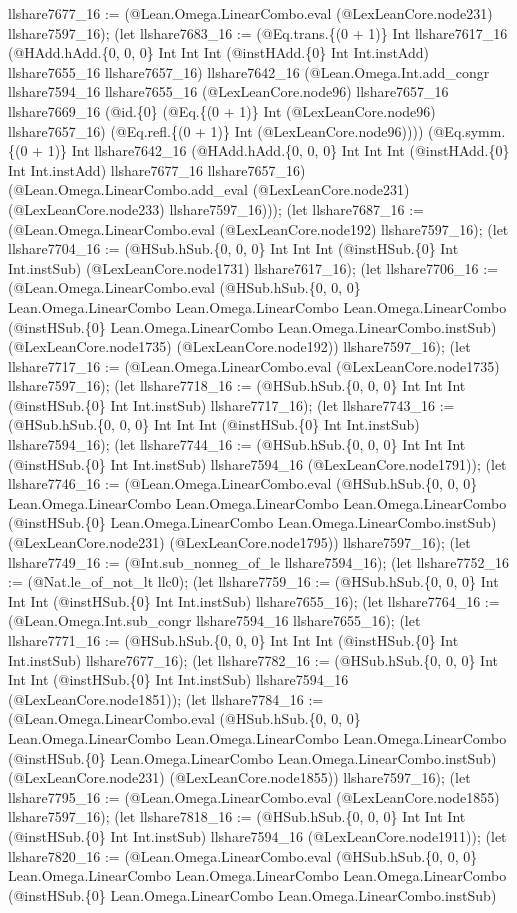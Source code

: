 \documentclass[11pt]{article}
\begin{document}
llshare7677\_16 := (@Lean.Omega.LinearCombo.eval (@LexLeanCore.node231) llshare7597\_16); (let llshare7683\_16 := (@Eq.trans.\{(0 + 1)\} Int llshare7617\_16 (@HAdd.hAdd.\{0, 0, 0\} Int Int Int (@instHAdd.\{0\} Int Int.instAdd) llshare7655\_16 llshare7657\_16) llshare7642\_16 (@Lean.Omega.Int.add\_congr llshare7594\_16 llshare7655\_16 (@LexLeanCore.node96) llshare7657\_16 llshare7669\_16 (@id.\{0\} (@Eq.\{(0 + 1)\} Int (@LexLeanCore.node96) llshare7657\_16) (@Eq.refl.\{(0 + 1)\} Int (@LexLeanCore.node96)))) (@Eq.symm.\{(0 + 1)\} Int llshare7642\_16 (@HAdd.hAdd.\{0, 0, 0\} Int Int Int (@instHAdd.\{0\} Int Int.instAdd) llshare7677\_16 llshare7657\_16) (@Lean.Omega.LinearCombo.add\_eval (@LexLeanCore.node231) (@LexLeanCore.node233) llshare7597\_16))); (let llshare7687\_16 := (@Lean.Omega.LinearCombo.eval (@LexLeanCore.node192) llshare7597\_16); (let llshare7704\_16 := (@HSub.hSub.\{0, 0, 0\} Int Int Int (@instHSub.\{0\} Int Int.instSub) (@LexLeanCore.node1731) llshare7617\_16); (let llshare7706\_16 := (@Lean.Omega.LinearCombo.eval (@HSub.hSub.\{0, 0, 0\} Lean.Omega.LinearCombo Lean.Omega.LinearCombo Lean.Omega.LinearCombo (@instHSub.\{0\} Lean.Omega.LinearCombo Lean.Omega.LinearCombo.instSub) (@LexLeanCore.node1735) (@LexLeanCore.node192)) llshare7597\_16); (let llshare7717\_16 := (@Lean.Omega.LinearCombo.eval (@LexLeanCore.node1735) llshare7597\_16); (let llshare7718\_16 := (@HSub.hSub.\{0, 0, 0\} Int Int Int (@instHSub.\{0\} Int Int.instSub) llshare7717\_16); (let llshare7743\_16 := (@HSub.hSub.\{0, 0, 0\} Int Int Int (@instHSub.\{0\} Int Int.instSub) llshare7594\_16); (let llshare7744\_16 := (@HSub.hSub.\{0, 0, 0\} Int Int Int (@instHSub.\{0\} Int Int.instSub) llshare7594\_16 (@LexLeanCore.node1791)); (let llshare7746\_16 := (@Lean.Omega.LinearCombo.eval (@HSub.hSub.\{0, 0, 0\} Lean.Omega.LinearCombo Lean.Omega.LinearCombo Lean.Omega.LinearCombo (@instHSub.\{0\} Lean.Omega.LinearCombo Lean.Omega.LinearCombo.instSub) (@LexLeanCore.node231) (@LexLeanCore.node1795)) llshare7597\_16); (let llshare7749\_16 := (@Int.sub\_nonneg\_of\_le llshare7594\_16); (let llshare7752\_16 := (@Nat.le\_of\_not\_lt llc0); (let llshare7759\_16 := (@HSub.hSub.\{0, 0, 0\} Int Int Int (@instHSub.\{0\} Int Int.instSub) llshare7655\_16); (let llshare7764\_16 := (@Lean.Omega.Int.sub\_congr llshare7594\_16 llshare7655\_16); (let llshare7771\_16 := (@HSub.hSub.\{0, 0, 0\} Int Int Int (@instHSub.\{0\} Int Int.instSub) llshare7677\_16); (let llshare7782\_16 := (@HSub.hSub.\{0, 0, 0\} Int Int Int (@instHSub.\{0\} Int Int.instSub) llshare7594\_16 (@LexLeanCore.node1851)); (let llshare7784\_16 := (@Lean.Omega.LinearCombo.eval (@HSub.hSub.\{0, 0, 0\} Lean.Omega.LinearCombo Lean.Omega.LinearCombo Lean.Omega.LinearCombo (@instHSub.\{0\} Lean.Omega.LinearCombo Lean.Omega.LinearCombo.instSub) (@LexLeanCore.node231) (@LexLeanCore.node1855)) llshare7597\_16); (let llshare7795\_16 := (@Lean.Omega.LinearCombo.eval (@LexLeanCore.node1855) llshare7597\_16); (let llshare7818\_16 := (@HSub.hSub.\{0, 0, 0\} Int Int Int (@instHSub.\{0\} Int Int.instSub) llshare7594\_16 (@LexLeanCore.node1911)); (let llshare7820\_16 := (@Lean.Omega.LinearCombo.eval (@HSub.hSub.\{0, 0, 0\} Lean.Omega.LinearCombo Lean.Omega.LinearCombo Lean.Omega.LinearCombo (@instHSub.\{0\} Lean.Omega.LinearCombo Lean.Omega.LinearCombo.instSub) 
\end{document}
